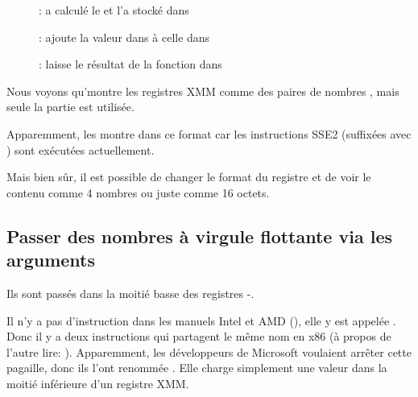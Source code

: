 \clearpage
\begin{figure}[H]
\centering
{}
\caption{\olly:  a calculé le  et l'a stocké
dans }
\label{fig:FPU_SIMD_simple_olly3}
\end{figure}

\clearpage
\begin{figure}[H]
\centering
{}
\caption{\olly:  ajoute la valeur dans  à celle dans }
\label{fig:FPU_SIMD_simple_olly4}
\end{figure}

\clearpage
\begin{figure}[H]
\centering
{}
\caption{\olly: \FLD laisse le résultat de la fonction dans }
\label{fig:FPU_SIMD_simple_olly5}
\end{figure}

Nous voyons qu'\olly montre les registres XMM comme des paires de nombres \Tdouble,
mais seule la partie  est utilisée.

Apparemment, \olly les montre dans ce format car les instructions SSE2 (suffixées
avec ) sont exécutées actuellement.

Mais bien sûr, il est possible de changer le format du registre et de voir le contenu
comme 4 nombres \Tfloat{} ou juste comme 16 octets.

\clearpage
\subsection{Passer des nombres à virgule flottante via les arguments}



Ils sont passés dans la moitié basse des registres -.



Il n'y a pas d'instruction  dans les manuels Intel et AMD (),
elle y est appelée .
Donc il y a deux instructions qui partagent le même nom en x86 (à propos de l'autre
lire: ).
Apparemment, les développeurs de Microsoft voulaient arrêter cette pagaille, donc
ils l'ont renommée .
Elle charge simplement une valeur dans la moitié inférieure d'un registre XMM.

